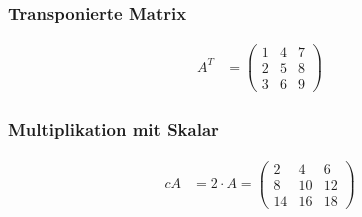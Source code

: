 \documentclass{article}
\begin{document}
\begin{minipage}[t]{0.45\textwidth}
    \subsubsection*{Transponierte Matrix}
    \begin{align*}
    A^T &= \begin{pmatrix}
    1 & 4 & 7 \\
    2 & 5 & 8 \\
    3 & 6 & 9
    \end{pmatrix}
    \end{align*}

    \subsubsection*{Multiplikation mit Skalar}
    \begin{align*}
    cA &= 2 \cdot A = \begin{pmatrix}
    2 & 4 & 6 \\
    8 & 10 & 12 \\
    14 & 16 & 18
    \end{pmatrix}
    \end{align*}
\end{minipage}
\end{document}
